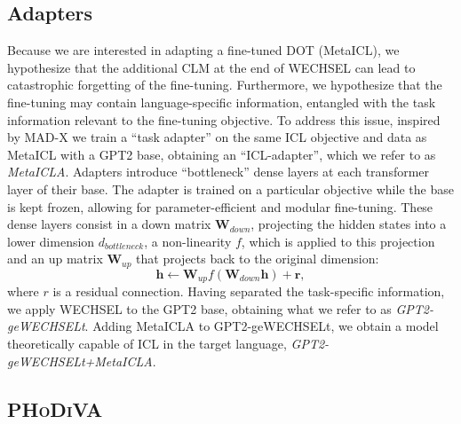 \documentclass[11pt]{article}
\begin{document}
\subsection{Adapters}\label{sec:method:adapters}

Because we are interested in adapting a fine-tuned DOT (MetaICL), we hypothesize that the additional
CLM at the end of WECHSEL can lead to catastrophic forgetting of the fine-tuning. Furthermore, we
hypothesize that the fine-tuning may contain language-specific information, entangled with the task
information relevant to the fine-tuning objective. To address this issue, inspired by MAD-X
\citep{pfeiffer_mad-x_2020} we train a ``task adapter'' on the same ICL objective and data as
MetaICL with a GPT2 base, obtaining an ``ICL-adapter'', which we refer to as \textit{MetaICLA}.
Adapters introduce ``bottleneck'' dense layers at each transformer layer of their base. The adapter
is trained on a particular objective while the base is kept frozen, allowing for parameter-efficient
and modular fine-tuning. These dense layers consist in a down matrix $\mathbf{W}_{down}$, projecting
the hidden states into a lower dimension $d_{bottleneck}$, a non-linearity $f$, which is applied to
this projection and an up matrix $\mathbf{W}_{up}$ that projects back to the original dimension:
\begin{equation} \mathbf{h} \leftarrow \mathbf{W}_{up} f(\mathbf{W}_{down} \mathbf{h}) + \mathbf{r},
\end{equation} where $r$ is a residual connection. Having separated the task-specific information,
we apply WECHSEL to the GPT2 base, obtaining what we refer to as \textit{GPT2-geWECHSELt}. Adding
MetaICLA to GPT2-geWECHSELt, we obtain a model theoretically capable of ICL in the target language,
\textit{GPT2-geWECHSELt+MetaICLA}.

\subsection{\textsc{PHoDiVA}}
\end{document}
